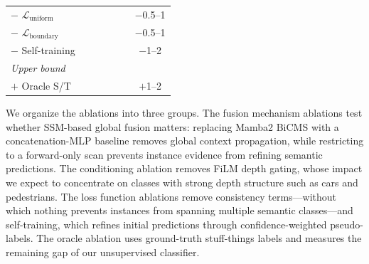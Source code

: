 \documentclass[10pt,twocolumn,letterpaper]{article}
\begin{document}
\begin{table}[t]
\begin{tabular}{p{2.5cm}cccccc}
$-$ $\mathcal{L}_{\text{uniform}}$ & \underline{\hspace{1em}} & \underline{\hspace{1em}} & \underline{\hspace{1em}} & \underline{\hspace{1em}} & \underline{\hspace{1em}} & $-$0.5--1 \\
$-$ $\mathcal{L}_{\text{boundary}}$ & \underline{\hspace{1em}} & \underline{\hspace{1em}} & \underline{\hspace{1em}} & \underline{\hspace{1em}} & \underline{\hspace{1em}} & $-$0.5--1 \\
$-$ Self-training & \underline{\hspace{1em}} & \underline{\hspace{1em}} & \underline{\hspace{1em}} & \underline{\hspace{1em}} & \underline{\hspace{1em}} & $-$1--2 \\
\midrule
\multicolumn{7}{l}{\emph{Upper bound}} \\
$+$ Oracle S/T & \underline{\hspace{1em}} & \underline{\hspace{1em}} & \underline{\hspace{1em}} & \underline{\hspace{1em}} & \underline{\hspace{1em}} & $+$1--2 \\
\bottomrule
\end{tabular}
\end{table}

We organize the ablations into three groups. The fusion mechanism ablations test whether SSM-based global fusion matters: replacing Mamba2 BiCMS with a concatenation-MLP baseline removes global context propagation, while restricting to a forward-only scan prevents instance evidence from refining semantic predictions. The conditioning ablation removes FiLM depth gating, whose impact we expect to concentrate on classes with strong depth structure such as cars and pedestrians. The loss function ablations remove consistency terms---without which nothing prevents instances from spanning multiple semantic classes---and self-training, which refines initial predictions through confidence-weighted pseudo-labels. The oracle ablation uses ground-truth stuff-things labels and measures the remaining gap of our unsupervised classifier.
\end{document}
